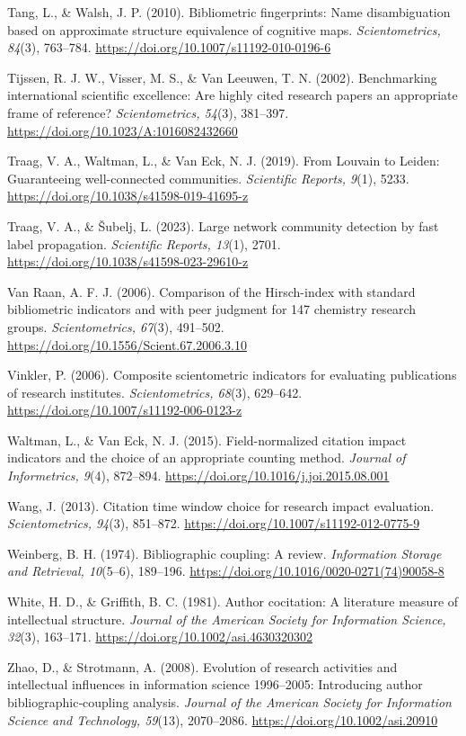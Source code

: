 \documentclass[
  letterpaper,
]{scrreprt}
\begin{document}
Tang, L., \& Walsh, J. P. (2010). Bibliometric fingerprints: Name
disambiguation based on approximate structure equivalence of cognitive
maps. \emph{Scientometrics, 84}(3), 763--784.
\url{https://doi.org/10.1007/s11192-010-0196-6}

Tijssen, R. J. W., Visser, M. S., \& Van Leeuwen, T. N. (2002).
Benchmarking international scientific excellence: Are highly cited
research papers an appropriate frame of reference? \emph{Scientometrics,
54}(3), 381--397. \url{https://doi.org/10.1023/A:1016082432660}

Traag, V. A., Waltman, L., \& Van Eck, N. J. (2019). From Louvain to
Leiden: Guaranteeing well-connected communities. \emph{Scientific
Reports, 9}(1), 5233. \url{https://doi.org/10.1038/s41598-019-41695-z}

Traag, V. A., \& Šubelj, L. (2023). Large network community detection by
fast label propagation. \emph{Scientific Reports, 13}(1), 2701.
\url{https://doi.org/10.1038/s41598-023-29610-z}

Van Raan, A. F. J. (2006). Comparison of the Hirsch-index with standard
bibliometric indicators and with peer judgment for 147 chemistry
research groups. \emph{Scientometrics, 67}(3), 491--502.
\url{https://doi.org/10.1556/Scient.67.2006.3.10}

Vinkler, P. (2006). Composite scientometric indicators for evaluating
publications of research institutes. \emph{Scientometrics, 68}(3),
629--642. \url{https://doi.org/10.1007/s11192-006-0123-z}

Waltman, L., \& Van Eck, N. J. (2015). Field-normalized citation impact
indicators and the choice of an appropriate counting method.
\emph{Journal of Informetrics, 9}(4), 872--894.
\url{https://doi.org/10.1016/j.joi.2015.08.001}

Wang, J. (2013). Citation time window choice for research impact
evaluation. \emph{Scientometrics, 94}(3), 851--872.
\url{https://doi.org/10.1007/s11192-012-0775-9}

Weinberg, B. H. (1974). Bibliographic coupling: A review.
\emph{Information Storage and Retrieval, 10}(5--6), 189--196.
\url{https://doi.org/10.1016/0020-0271(74)90058-8}

White, H. D., \& Griffith, B. C. (1981). Author cocitation: A literature
measure of intellectual structure. \emph{Journal of the American Society
for Information Science, 32}(3), 163--171.
\url{https://doi.org/10.1002/asi.4630320302}

Zhao, D., \& Strotmann, A. (2008). Evolution of research activities and
intellectual influences in information science 1996--2005: Introducing
author bibliographic‐coupling analysis. \emph{Journal of the American
Society for Information Science and Technology, 59}(13), 2070--2086.
\url{https://doi.org/10.1002/asi.20910}
\end{document}
